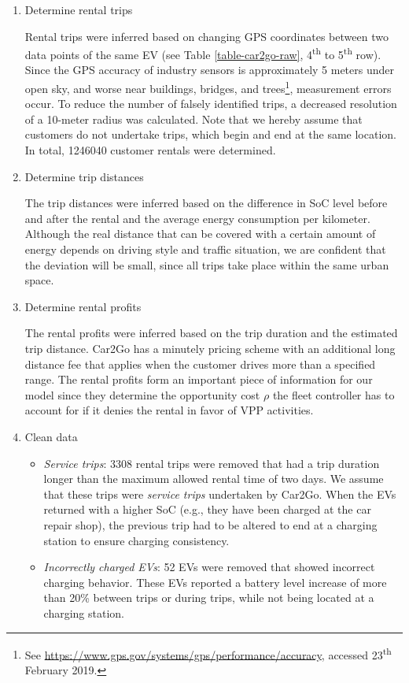 \documentclass[a4paper, 12pt]{article}
\begin{document}
\begin{enumerate}
\item Determine rental trips

Rental trips were inferred based on changing GPS coordinates between two data
points of the same EV (see Table \ref{table-car2go-raw}, 4\textsuperscript{th} to 5\textsuperscript{th} row).
Since the GPS accuracy of industry sensors is approximately 5 meters under
open sky, and worse near buildings, bridges, and trees\footnote{See \url{https://www.gps.gov/systems/gps/performance/accuracy}, accessed
23\textsuperscript{th} February 2019.}, measurement
errors occur. To reduce the number of falsely identified trips, a decreased
resolution of a 10-meter radius was calculated. Note that we hereby assume
that customers do not undertake trips, which begin and end at the same
location. In total, 1246040 customer rentals were determined.

\item Determine trip distances

The trip distances were inferred based on the difference in SoC level before
and after the rental and the average energy consumption per kilometer.
Although the real distance that can be covered with a certain amount of
energy depends on driving style and traffic situation, we are confident that
the deviation will be small, since all trips take place within the same urban
space.

\item Determine rental profits

The rental profits were inferred based on the trip duration and the estimated
trip distance. Car2Go has a minutely pricing scheme with an additional long
distance fee that applies when the customer drives more than a specified
range. The rental profits form an important piece of information for our
model since they determine the opportunity cost \(\rho\) the fleet controller
has to account for if it denies the rental in favor of VPP activities.

\item Clean data
\begin{itemize}
\item \emph{Service trips}: 3308 rental trips were removed that had a trip duration
longer than the maximum allowed rental time of two days. We assume that
these trips were \emph{service trips} undertaken by Car2Go. When the EVs
returned with a higher SoC (e.g., they have been charged at the car repair
shop), the previous trip had to be altered to end at a charging station to
ensure charging consistency.
\item \emph{Incorrectly charged EVs}: 52 EVs were removed that showed incorrect
charging behavior. These EVs reported a battery level increase of more than 20\%
between trips or during trips, while not being located at a charging station.
\end{itemize}
\end{enumerate}
\end{document}
